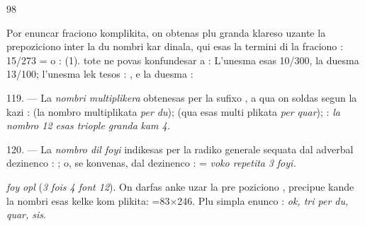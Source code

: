 \begin{VUpage}[102]{98}

Por enuncar fraciono komplikita, on obtenas plu granda\nl
klareso uzante la prepoziciono  inter la du nombri kar\cc
dinala, qui esas la termini di la fraciono : 15/273 = \nl
{} o :  (1).\nl
{} tote ne povas konfundesar a : \cc
{} L'unesma esas 10/300, la duesma 13/100; l'unesma lek\cc
tesos : , e la duesma : 

\VUblanc{4.94pt}%
119. --- La \textit{nombri multiplikera} obtenesas per la sufixo\nl
{}, a qua on soldas  segun la kazi :  (la\nl
nombro multiplikata \textit{per du});  (qua esas multi\cc
plikata \textit{per quar});  : \textit{la nombro 12 esas triople granda}\nl
\textit{kam 4.}

\VUblanc{6.02pt}%
120. --- La \textit{nombro dil foyi} indikesas per la radiko \nl
generale sequata dal adverbal dezinenco  : ; o, se\nl
konvenas, dal dezinenco  :  = \textit{voko repetita}\nl
\textit{3 foyi.}

\nl
{} \textit{foy}  \textit{opl} \nl
{} (\textit{3 fois 4 font 12}). On darfas anke uzar la pre\cc
poziciono , precipue kande la nombri esas kelke kom\cc
plikita: =83×246.\nl
Plu simpla enunco : \textit{ok, tri per du, quar, sis}.


\end{VUpage}
